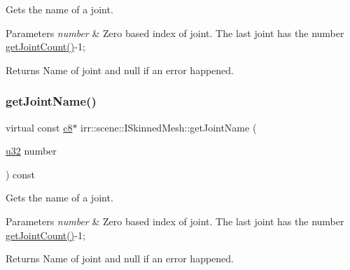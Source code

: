 Gets the name of a joint. 


\begin{DoxyParams}{Parameters}
{\em number} & Zero based index of joint. The last joint has the number \hyperlink{classirr_1_1scene_1_1ISkinnedMesh_a7715fb82ffec225d2fd9b8aa860e3c38}{get\+Joint\+Count()}-\/1; \\
\hline
\end{DoxyParams}
\begin{DoxyReturn}{Returns}
Name of joint and null if an error happened. 
\end{DoxyReturn}
\mbox{\label{classirr_1_1scene_1_1ISkinnedMesh_ab28aed78a7e2eeaa20ba7eb0eb082ba4}} 
\subsubsection{\texorpdfstring{get\+Joint\+Name()}{getJointName()}\hspace{0.1cm}{\footnotesize\ttfamily [2/2]}}
{\footnotesize\ttfamily virtual const \hyperlink{namespaceirr_a9395eaea339bcb546b319e9c96bf7410}{c8}$\ast$ irr\+::scene\+::\+I\+Skinned\+Mesh\+::get\+Joint\+Name (\begin{DoxyParamCaption}\item[{\hyperlink{namespaceirr_a0416a53257075833e7002efd0a18e804}{u32}}]{number }\end{DoxyParamCaption}) const\hspace{0.3cm}{\ttfamily [pure virtual]}}



Gets the name of a joint. 


\begin{DoxyParams}{Parameters}
{\em number} & Zero based index of joint. The last joint has the number \hyperlink{classirr_1_1scene_1_1ISkinnedMesh_a7715fb82ffec225d2fd9b8aa860e3c38}{get\+Joint\+Count()}-\/1; \\
\hline
\end{DoxyParams}
\begin{DoxyReturn}{Returns}
Name of joint and null if an error happened. 
\end{DoxyReturn}
\mbox{\label{classirr_1_1scene_1_1ISkinnedMesh_ace7288f54490d017efebe24c3eb46ab8}} 
